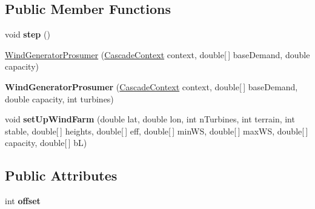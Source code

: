 \subsection*{Public Member Functions}
\begin{DoxyCompactItemize}
\item 
\hypertarget{classuk_1_1ac_1_1dmu_1_1iesd_1_1cascade_1_1agents_1_1prosumers_1_1_wind_generator_prosumer_ab31dbfac981200bb989dca57a0158cba}{void {\bfseries step} ()}\label{classuk_1_1ac_1_1dmu_1_1iesd_1_1cascade_1_1agents_1_1prosumers_1_1_wind_generator_prosumer_ab31dbfac981200bb989dca57a0158cba}

\item 
\hyperlink{classuk_1_1ac_1_1dmu_1_1iesd_1_1cascade_1_1agents_1_1prosumers_1_1_wind_generator_prosumer_a0ab24e789a00cf7ceea811e102e06ee1}{Wind\-Generator\-Prosumer} (\hyperlink{classuk_1_1ac_1_1dmu_1_1iesd_1_1cascade_1_1context_1_1_cascade_context}{Cascade\-Context} context, double\mbox{[}$\,$\mbox{]} base\-Demand, double capacity)
\item 
\hypertarget{classuk_1_1ac_1_1dmu_1_1iesd_1_1cascade_1_1agents_1_1prosumers_1_1_wind_generator_prosumer_ab15bffa2c46ab858afa6ce51846a2e30}{{\bfseries Wind\-Generator\-Prosumer} (\hyperlink{classuk_1_1ac_1_1dmu_1_1iesd_1_1cascade_1_1context_1_1_cascade_context}{Cascade\-Context} context, double\mbox{[}$\,$\mbox{]} base\-Demand, double capacity, int turbines)}\label{classuk_1_1ac_1_1dmu_1_1iesd_1_1cascade_1_1agents_1_1prosumers_1_1_wind_generator_prosumer_ab15bffa2c46ab858afa6ce51846a2e30}

\item 
\hypertarget{classuk_1_1ac_1_1dmu_1_1iesd_1_1cascade_1_1agents_1_1prosumers_1_1_wind_generator_prosumer_a2046dc0ffae71d16408b882db3b3d7cd}{void {\bfseries set\-Up\-Wind\-Farm} (double lat, double lon, int n\-Turbines, int terrain, int stable, double\mbox{[}$\,$\mbox{]} heights, double\mbox{[}$\,$\mbox{]} eff, double\mbox{[}$\,$\mbox{]} min\-W\-S, double\mbox{[}$\,$\mbox{]} max\-W\-S, double\mbox{[}$\,$\mbox{]} capacity, double\mbox{[}$\,$\mbox{]} b\-L)}\label{classuk_1_1ac_1_1dmu_1_1iesd_1_1cascade_1_1agents_1_1prosumers_1_1_wind_generator_prosumer_a2046dc0ffae71d16408b882db3b3d7cd}

\end{DoxyCompactItemize}
\subsection*{Public Attributes}
\begin{DoxyCompactItemize}
\item 
\hypertarget{classuk_1_1ac_1_1dmu_1_1iesd_1_1cascade_1_1agents_1_1prosumers_1_1_wind_generator_prosumer_aa29ce35874d937f50a2922d196cbdb9b}{int {\bfseries offset}}\label{classuk_1_1ac_1_1dmu_1_1iesd_1_1cascade_1_1agents_1_1prosumers_1_1_wind_generator_prosumer_aa29ce35874d937f50a2922d196cbdb9b}

\end{DoxyCompactItemize}

